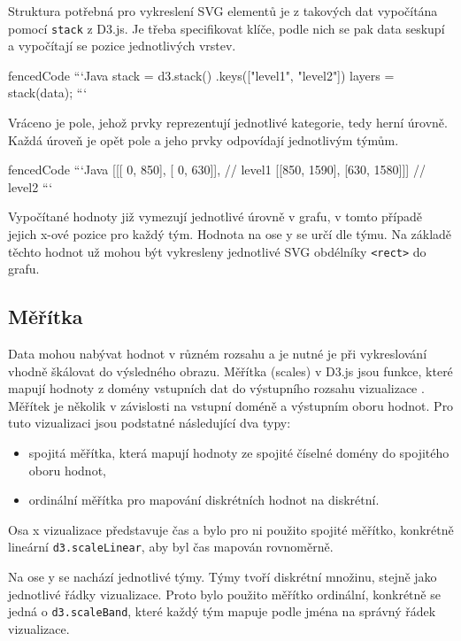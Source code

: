 \documentclass[
  digital, %
  oneside, %
  table,   %
  nolof,     %
  nolot,     %
]{fithesis3}
\begin{document}
Struktura potřebná pro vykreslení SVG elementů je z takových dat vypočítána pomocí \verb|stack| z D3.js. Je třeba specifikovat klíče, podle nich se pak data seskupí a vypočítají se pozice jednotlivých vrstev.

\begin{markdown*}{
  fencedCode
}
```Java
	stack = d3.stack()
			  .keys(["level1", "level2"])
	layers = stack(data);
```
\end{markdown*}
Vráceno je pole, jehož prvky reprezentují jednotlivé kategorie, tedy herní úrovně. Každá úroveň je opět pole a jeho prvky odpovídají jednotlivým týmům.
\begin{markdown*}{
  fencedCode
}
```Java
	[[[   0, 850], [   0, 630]],     // level1
	  [[850, 1590], [630, 1580]]]    // level2
```
\end{markdown*}
Vypočítané hodnoty již vymezují jednotlivé úrovně v grafu, v tomto případě jejich \mbox{x-ové} pozice pro každý tým. Hodnota na ose y se určí dle týmu. Na základě těchto hodnot už mohou být vykresleny jednotlivé SVG obdélníky \verb|<rect>| do grafu.

\subsection{Měřítka}
Data mohou nabývat hodnot v různém rozsahu a je nutné je při vykreslování vhodně škálovat do výsledného obrazu. Měřítka (scales) v D3.js jsou funkce, které mapují hodnoty z domény vstupních dat do výstupního rozsahu vizualizace \cite{d3jsorg}. Měřítek je několik v závislosti na vstupní doméně a výstupním oboru hodnot. Pro tuto vizualizaci jsou podstatné následující dva typy:
\begin{itemize}
  \item spojitá měřítka, která mapují hodnoty ze spojité číselné domény do spojitého oboru hodnot,
  \item ordinální měřítka pro mapování diskrétních hodnot na diskrétní.
\end{itemize}
Osa x vizualizace představuje čas a bylo pro ni použito spojité měřítko, konkrétně lineární \verb|d3.scaleLinear|, aby byl čas mapován rovnoměrně.\par
Na ose y se nachází jednotlivé týmy. Týmy tvoří diskrétní množinu, stejně jako jednotlivé řádky vizualizace. Proto bylo použito měřítko ordinální, konkrétně se jedná o \verb|d3.scaleBand|, které každý tým mapuje podle jména na správný řádek vizualizace.
\end{document}
